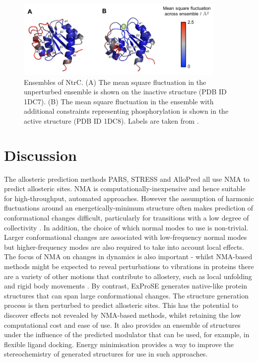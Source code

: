 \begin{figure}
\centering

\includegraphics[width=0.9\textwidth]{figures/ntrc/ntrc}

\caption[Ensembles of NtrC generated with ExProSE]
{Ensembles of NtrC.
(A) The mean square fluctuation in the unperturbed ensemble is shown on the inactive structure (PDB ID 1DC7).
(B) The mean square fluctuation in the ensemble with additional constraints representing phosphorylation is shown in the active structure (PDB ID 1DC8).
Labels are taken from \cite{Volkman2001}.}

\label{fig:ntrc}
\end{figure}


\section{Discussion}
\label{sec:exprose_discussion}

The allosteric prediction methods PARS, STRESS and AlloPred all use NMA to predict allosteric sites.
NMA is computationally-inexpensive and hence suitable for high-throughput, automated approaches.
However the assumption of harmonic fluctuations around an energetically-minimum structure often makes prediction of conformational changes difficult, particularly for transitions with a low degree of collectivity \cite{Yang2007}.
In addition, the choice of which normal modes to use is non-trivial.
Larger conformational changes are associated with low-frequency normal modes but higher-frequency modes are also required to take into account local effects.
The focus of NMA on changes in dynamics is also important - whilst NMA-based methods might be expected to reveal perturbations to vibrations in proteins there are a variety of other motions that contribute to allostery, such as local unfolding and rigid body movements \cite{Motlagh2014}.
By contrast, ExProSE generates native-like protein structures that can span large conformational changes.
The structure generation process is then perturbed to predict allosteric sites.
This has the potential to discover effects not revealed by NMA-based methods, whilst retaining the low computational cost and ease of use.
It also provides an ensemble of structures under the influence of the predicted modulator that can be used, for example, in flexible ligand docking.
Energy minimisation provides a way to improve the stereochemistry of generated structures for use in such approaches.


